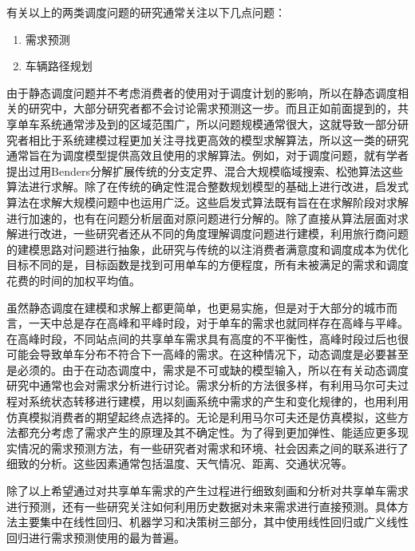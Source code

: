 \documentclass[]{tongjithesis}
\numberwithin{equation}{chapter}
\begin{document}
有关以上的两类调度问题的研究通常关注以下几点问题：
\begin{enumerate}
	\item 需求预测
	\item 车辆路径规划
\end{enumerate}

由于静态调度问题并不考虑消费者的使用对于调度计划的影响，所以在静态调度相关的研究中，大部分研究者都不会讨论需求预测这一步。而且正如前面提到的，共享单车系统通常涉及到的区域范围广，所以问题规模通常很大，这就导致一部分研究者相比于系统建模过程更加关注寻找更高效的模型求解算法，所以这一类的研究通常旨在为调度模型提供高效且使用的求解算法。例如，对于调度问题，就有学者提出过用Benders分解扩展传统的分支定界\cite{erdougan2015exact}、混合大规模临域搜索\cite{pal2017free}、松弛算法\cite{chemla2013bike}这些算法进行求解。除了在传统的确定性混合整数规划模型的基础上进行改进，启发式算法在求解大规模问题中也运用广泛\cite{ho2014solving,forma20153}。这些启发式算法既有旨在在求解阶段对求解进行加速的，也有在问题分析层面对原问题进行分解的。除了直接从算法层面对求解进行改进，一些研究者还从不同的角度理解调度问题进行建模，利用旅行商问题的建模思路对问题进行抽象\cite{chemla2013bike}，此研究与传统的以注消费者满意度和调度成本为优化目标不同的是，目标函数是找到可用单车的方便程度，所有未被满足的需求和调度花费的时间的加权平均值。

虽然静态调度在建模和求解上都更简单，也更易实施，但是对于大部分的城市而言，一天中总是存在高峰和平峰时段，对于单车的需求也就同样存在高峰与平峰。在高峰时段，不同站点间的共享单车需求具有高度的不平衡性，高峰时段过后也很可能会导致单车分布不符合下一高峰的需求。在这种情况下，动态调度是必要甚至是必须的。由于在动态调度中，需求是不可或缺的模型输入，所以在有关动态调度研究中通常也会对需求分析进行讨论。需求分析的方法很多样，有利用马尔可夫过程对系统状态转移进行建模，用以刻画系统中需求的产生和变化规律的\cite{schuijbroek2017inventory}，也用利用仿真模拟消费者的期望起终点选择的\cite{caggiani2013dynamic}。无论是利用马尔可夫还是仿真模拟，这些方法都充分考虑了需求产生的原理及其不确定性。为了得到更加弹性、能适应更多现实情况的需求预测方法，有一些研究者对需求和环境、社会因素之间的联系进行了细致的分析。这些因素通常包括温度、天气情况、距离、交通状况等\cite{frade2014bicycle,faghih2014land}。

除了以上希望通过对共享单车需求的产生过程进行细致刻画和分析对共享单车需求进行预测，还有一些研究关注如何利用历史数据对未来需求进行直接预测。具体方法主要集中在线性回归、机器学习和决策树三部分，其中使用线性回归或广义线性回归进行需求预测使用的最为普遍。
\end{document}
